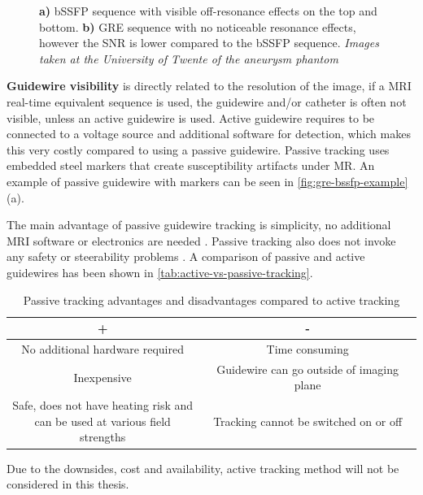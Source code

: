 \documentclass{article}
\begin{document}
\begin{figure}[h]
\begin{minipage}{0.45\textwidth}
        \subcaption{}
        \label{fig:gre-example}
    \end{minipage}
    \caption{\textbf{a)} bSSFP sequence with visible off-resonance effects on the top and bottom. \textbf{b)} GRE sequence with no noticeable resonance effects, however the SNR is lower compared to the bSSFP sequence. \textit{Images taken at the University of Twente of the aneurysm phantom} }
    \label{fig:gre-bssfp-example}
\end{figure}

\textbf{Guidewire visibility} is directly related to the resolution of the image, if a MRI real-time equivalent sequence is used, the guidewire and/or catheter is often not visible, unless an active guidewire is used. Active guidewire requires to be connected to a voltage source and additional software for detection, which makes this very costly compared to using a passive guidewire. Passive tracking uses embedded steel markers that create susceptibility artifacts under MR. An example of passive guidewire with markers can be seen in \autoref{fig:gre-bssfp-example} (a). 

The main advantage of passive guidewire tracking is simplicity, no additional MRI software or electronics are needed \cite{active-vs-passive-tracking}. Passive tracking also does not invoke any safety or steerability problems \cite{visualization-techniques-of-mri-guidewires}. A comparison of passive and active guidewires has been shown in \autoref{tab:active-vs-passive-tracking}.

\begin{table}[h]
    \centering
    \begin{tabular}{|c|c|} \hline 
         \textbf{+}&\textbf{-}\\ \hline 
         No additional hardware required & Time consuming\\ \hline 
         Inexpensive & Guidewire can go outside of imaging plane\\ \hline 
         \makecell{Safe, does not have heating risk and \\ can be used at various field strengths} & Tracking cannot be switched on or off \\
         \hline
    \end{tabular}
    \caption{Passive tracking advantages and disadvantages compared to active tracking \cite{active-vs-passive-tracking}}
    \label{tab:active-vs-passive-tracking}
\end{table}

Due to the downsides, cost and availability, active tracking method will not be considered in this thesis.
\end{document}
